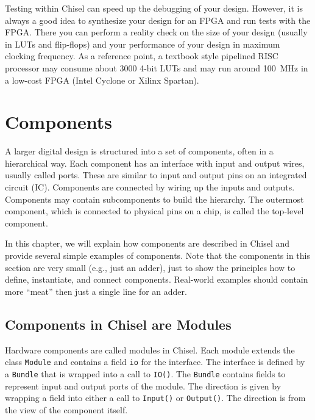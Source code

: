 \documentclass[%
    10pt,
    headinclude, footexclude,
    openright, %
    notitlepage,
    cleardoubleempty,
    headsepline,
    pointlessnumbers,
    bibtotoc, idxtotoc,
    ]{scrbook}
\newcommand{\code}[1]{{\small{\texttt{#1}}}}
\begin{document}
Testing within Chisel can speed up the debugging of your design.
However, it is always a good idea to synthesize your design for an FPGA and run tests
with the FPGA. There you can perform a reality check on the size of your design (usually
in LUTs and flip-flops) and your performance of your design in maximum clocking frequency.
As a reference point, a textbook style pipelined RISC processor may consume about 3000
4-bit LUTs and may run around 100~MHz in a low-cost FPGA (Intel Cyclone or
Xilinx Spartan).

\chapter{Components}


A larger digital design is structured into a set of components, often in
a hierarchical way. Each component has an interface with input and output
wires, usually called ports. These are similar to input and output pins on an integrated circuit (IC).
Components are connected by wiring up the inputs and outputs.
Components may contain subcomponents to build the hierarchy.
The outermost component, which is connected to physical pins
on a chip, is called the top-level component.

In this chapter, we will explain how components are described in Chisel and
provide several simple examples of components.
Note that the components in this section are very small (e.g., just an adder),
just to show the principles how to define, instantiate, and connect components.
Real-world examples should contain more ``meat'' then just a single line for
an adder.

\section{Components in Chisel are Modules}


Hardware components are called modules in Chisel. Each module extends
the class \code{Module} and contains a field \code{io} for the interface.
The interface is defined by a \code{Bundle} that is wrapped into a call to \code{IO()}.
The \code{Bundle} contains fields to represent input and output ports of
the module. The direction is given by wrapping a field into either a call to \code{Input()}
or \code{Output()}. The direction is from the view of the component itself.
\end{document}
